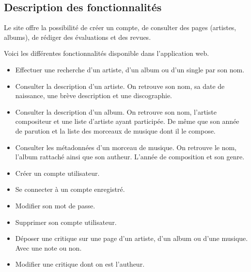  \subsection{Description des fonctionnalités}

    \begin{paragraphe}
      	Le site offre la possibilité de créer un compte, de consulter des pages
        (artistes, albums), de rédiger des évaluations et des revues.
    \end{paragraphe}

    \begin{paragraphe}
      Voici les différentes fonctionnalités disponible dans l'application web.
    \end{paragraphe}

    \begin{paragraphe}
      \begin{itemize}
        \item Effectuer une recherche d'un artiste, d'un album ou d'un single
          par son nom.
        \item Consulter la description d'un artiste. On retrouve son nom, sa
          date de naissance, une brève description et une discographie.
        \item Consulter la description d'un album. On retrouve son nom,
          l'artiste compositeur et une liste d'artiste ayant participée. De
          même que son année de parution et la liste des morceaux de musique
          dont il le compose.
        \item Consulter les métadonnées d'un morceau de musique. On retrouve
          le nom, l'album rattaché ainsi que son autheur. L'année de composition
          et son genre.
      \end{itemize}
    \end{paragraphe}

    \begin{paragraphe}
      \begin{itemize}
        \item Créer un compte utilisateur.
        \item Se connecter à un compte enregistré.
        \item Modifier son mot de passe.
        \item Supprimer son compte utilisateur.
      \end{itemize}
    \end{paragraphe}

    \begin{paragraphe}
      \begin{itemize}
        \item Déposer une critique sur une page d'un artiste, d'un album ou
          d'une musique. Avec une note ou non.
        \item Modifier une critique dont on est l'autheur.
      \end{itemize}
    \end{paragraphe}

